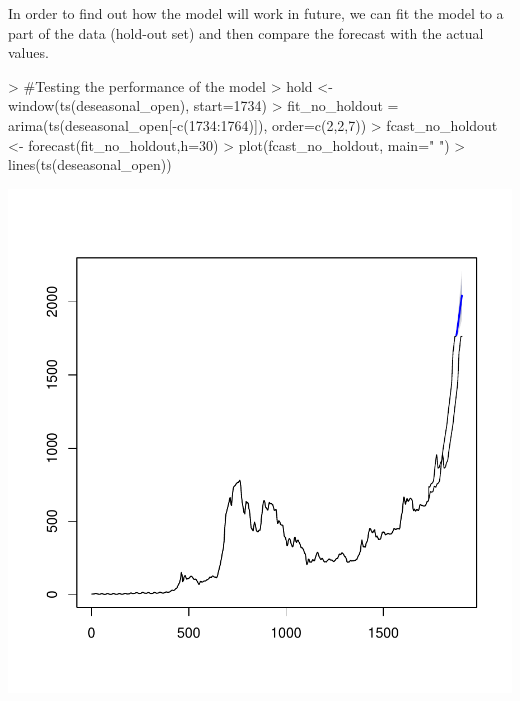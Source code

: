 \documentclass{article}
\begin{document}
In order to find out how the model will work in future, we can fit the model to a part of the data (hold-out set) and then compare the forecast with the actual values. 
\begin{Schunk}
\begin{Sinput}
> #Testing the performance of the model
> hold <- window(ts(deseasonal_open), start=1734)
> fit_no_holdout = arima(ts(deseasonal_open[-c(1734:1764)]), order=c(2,2,7))
> fcast_no_holdout <- forecast(fit_no_holdout,h=30)
> plot(fcast_no_holdout, main=" ")
> lines(ts(deseasonal_open))
\end{Sinput}
\end{Schunk}
\includegraphics{Report-020}
\end{document}
